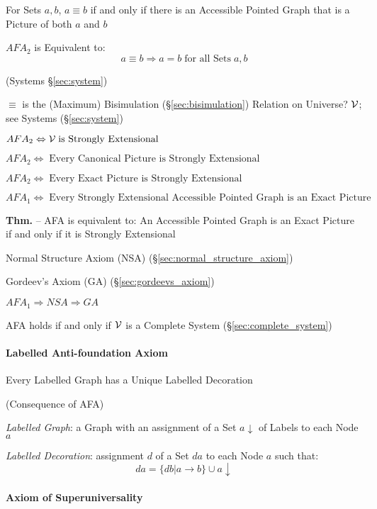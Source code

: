 For Sets $a,b$, $a \equiv b$ if and only if there is an Accessible
Pointed Graph that is a Picture of both $a$ and $b$

$AFA_2$ is Equivalent to:
\[
  a \equiv b \Rightarrow a = b \;\text{for all Sets}\; a,b
\]

(Systems \S\ref{sec:system})

$\equiv$ is the (Maximum) Bisimulation (\S\ref{sec:bisimulation}) Relation on
Universe? $\mathcal{V}$; see Systems (\S\ref{sec:system})

$AFA_2 \Leftrightarrow \mathcal{V} \;\text{is Strongly Extensional}$

$AFA_2 \Leftrightarrow \;\text{Every Canonical Picture is Strongly
  Extensional}$

$AFA_2 \Leftrightarrow \;\text{Every Exact Picture is Strongly
  Extensional}$

$AFA_1 \Leftrightarrow \;\text{Every Strongly Extensional Accessible
  Pointed Graph is an Exact Picture}$

\textbf{Thm.} -- AFA is equivalent to: An Accessible Pointed Graph is
an Exact Picture if and only if it is Strongly Extensional

Normal Structure Axiom (NSA) (\S\ref{sec:normal_structure_axiom})

Gordeev's Axiom (GA) (\S\ref{sec:gordeevs_axiom})

$AFA_1 \Rightarrow NSA \Rightarrow GA$

AFA holds if and only if $\mathcal{V}$ is a Complete System
(\S\ref{sec:complete_system})



\paragraph{Labelled Anti-foundation Axiom}
\label{sec:labelled_antifoundation}\hfill

\cite{aczel88}

Every Labelled Graph has a Unique Labelled Decoration

(Consequence of AFA)

\emph{Labelled Graph}: a Graph with an assignment of a Set
$a\downarrow$ of Labels to each Node $a$

\emph{Labelled Decoration}: assignment $d$ of a Set $d a$ to each Node
$a$ such that:
\[
  da = \{db | a \rightarrow b\} \cup a \downarrow
\]



\paragraph{Axiom of Superuniversality}
\label{sec:superuniversality_axiom}\hfill

